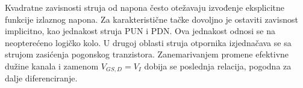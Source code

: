 Kvadratne zavisnosti struja od napona često otežavaju izvođenje eksplicitne funkcije izlaznog napona. Za karakteristične tačke dovoljno je ostaviti zavisnost implicitno, kao jednakost struja PUN i PDN. Ova jednakost odnosi se na neopterećeno logičko kolo. U drugoj oblasti struja otpornika izjednačava se sa strujom zasićenja pogonskog tranzistora. Zanemarivanjem promene efektivne dužine kanala i zamenom $V_{GS,D}=V_I$ dobija se poslednja relacija, pogodna za dalje diferenciranje.

